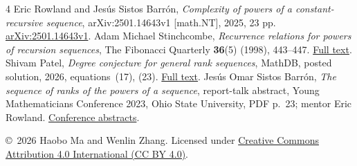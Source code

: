 \documentclass[11pt]{article}
\begin{document}
\begin{thebibliography}{4}
Eric Rowland and Jes\'us Sistos Barr\'on,
\emph{Complexity of powers of a constant-recursive sequence},
arXiv:2501.14643v1 [math.NT], 2025, 23 pp.
\href{https://arxiv.org/abs/2501.14643v1}{arXiv:2501.14643v1}.
Adam Michael Stinchcombe,
\emph{Recurrence relations for powers of recursion sequences},
The Fibonacci Quarterly \textbf{36}(5) (1998), 443--447.
\href{https://www.fq.math.ca/Scanned/36-5/stinchcombe.pdf}{Full text}.
Shivam Patel,
\emph{Degree conjecture for general rank sequences}, MathDB,
posted solution, 2026, equations~(17), (23).
\href{https://mathdb.com/p/366796/degree-conjecture-for-general-rank-sequences}{Full text}.
Jes\'us Omar Sistos Barr\'on,
\emph{The sequence of ranks of the powers of a sequence}, report-talk
abstract, Young Mathematicians Conference 2023, Ohio State University,
PDF p.~23; mentor Eric Rowland.
\href{https://ymc.osu.edu/sites/default/files/2023-08/ymc_2023-2.pdf}{Conference abstracts}.
\end{thebibliography}

\noindent\small\copyright\ 2026 Haobo Ma and Wenlin Zhang.
Licensed under \href{https://creativecommons.org/licenses/by/4.0/}{Creative Commons Attribution 4.0 International (CC BY 4.0)}.
\end{document}
